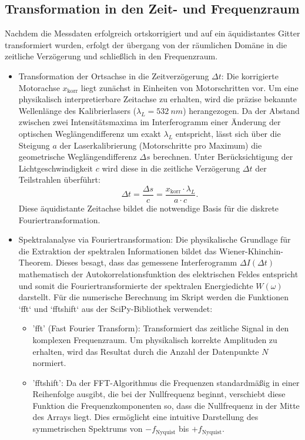 \documentclass[10pt,a4paper]{article}
\begin{document}
\subsection{Transformation in den Zeit- und Frequenzraum}


Nachdem die Messdaten erfolgreich ortskorrigiert und auf ein äquidistantes Gitter transformiert wurden, erfolgt der übergang von der räumlichen Domäne in die zeitliche Verzögerung und schließlich in den Frequenzraum.

\begin{itemize}
       \item Transformation der Ortsachse in die Zeitverzögerung $\Delta t$: Die korrigierte Motorachse $x_{\text{korr}}$ liegt zunächst in Einheiten von Motorschritten vor. Um eine physikalisch interpretierbare Zeitachse zu erhalten, wird die präzise bekannte Wellenlänge des Kalibrierlasers ($\lambda_L = \qty{532}{nm}$) herangezogen. Da der Abstand zwischen zwei Intensitätsmaxima im Interferogramm einer Änderung der optischen Weglängendifferenz um exakt $\lambda_L$ entspricht, lässt sich über die Steigung $a$ der Laserkalibrierung (Motorschritte pro Maximum) die geometrische Weglängendifferenz $\Delta s$ berechnen. Unter Berücksichtigung der Lichtgeschwindigkeit $c$ wird diese in die zeitliche Verzögerung $\Delta t$ der Teilstrahlen überführt: $$\Delta t = \frac{\Delta s}{c} = \frac{x_{\text{korr}} \cdot \lambda_L}{a \cdot c}.$$ Diese äquidistante Zeitachse bildet die notwendige Basis für die diskrete Fouriertransformation.
       \item Spektralanalyse via Fouriertransformation: Die physikalische Grundlage für die Extraktion der spektralen Informationen bildet das Wiener-Khinchin-Theorem. Dieses besagt, dass das gemessene Interferogramm $\Delta I(\Delta t)$ mathematisch der Autokorrelationsfunktion des elektrischen Feldes entspricht und somit die Fouriertransformierte der spektralen Energiedichte $W(\omega)$ darstellt. Für die numerische Berechnung im Skript werden die Funktionen `fft` und `fftshift` aus der SciPy-Bibliothek verwendet:
       \begin{itemize}
              \item 'fft' (Fast Fourier Transform): Transformiert das zeitliche Signal in den komplexen Frequenzraum. Um physikalisch korrekte Amplituden zu erhalten, wird das Resultat durch die Anzahl der Datenpunkte $N$ normiert.
              \item 'fftshift': Da der FFT-Algorithmus die Frequenzen standardmäßig in einer Reihenfolge ausgibt, die bei der Nullfrequenz beginnt, verschiebt diese Funktion die Frequenzkomponenten so, dass die Nullfrequenz in der Mitte des Arrays liegt. Dies ermöglicht eine intuitive Darstellung des symmetrischen Spektrums von $-f_{\text{Nyquist}}$ bis $+f_{\text{Nyquist}}$.

\end{itemize}
\end{itemize}
\end{document}
